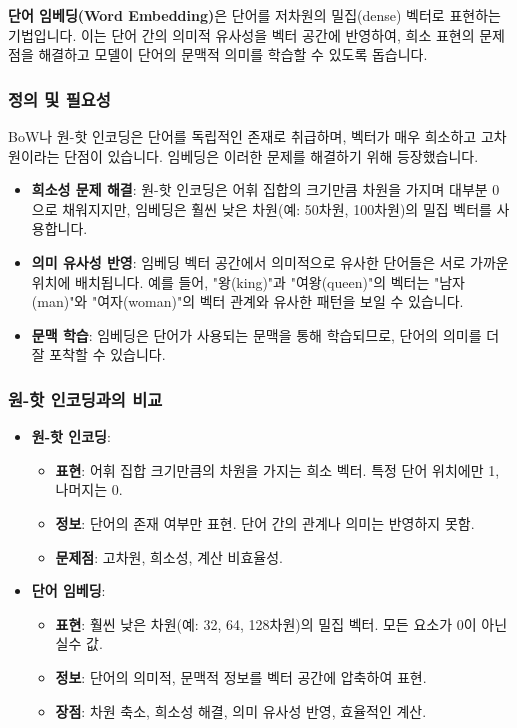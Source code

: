 \documentclass[11pt,a4paper]{article}
\begin{document}
\begin{conceptbox}
\textbf{단어 임베딩(Word Embedding)}은 단어를 저차원의 밀집(dense) 벡터로 표현하는 기법입니다. 이는 단어 간의 의미적 유사성을 벡터 공간에 반영하여, 희소 표현의 문제점을 해결하고 모델이 단어의 문맥적 의미를 학습할 수 있도록 돕습니다.
\end{conceptbox}

\subsubsection{정의 및 필요성}
BoW나 원-핫 인코딩은 단어를 독립적인 존재로 취급하며, 벡터가 매우 희소하고 고차원이라는 단점이 있습니다. 임베딩은 이러한 문제를 해결하기 위해 등장했습니다.

\begin{itemize}
    \item \textbf{희소성 문제 해결}: 원-핫 인코딩은 어휘 집합의 크기만큼 차원을 가지며 대부분 0으로 채워지지만, 임베딩은 훨씬 낮은 차원(예: 50차원, 100차원)의 밀집 벡터를 사용합니다.
    \item \textbf{의미 유사성 반영}: 임베딩 벡터 공간에서 의미적으로 유사한 단어들은 서로 가까운 위치에 배치됩니다. 예를 들어, "왕(king)"과 "여왕(queen)"의 벡터는 "남자(man)"와 "여자(woman)"의 벡터 관계와 유사한 패턴을 보일 수 있습니다.
    \item \textbf{문맥 학습}: 임베딩은 단어가 사용되는 문맥을 통해 학습되므로, 단어의 의미를 더 잘 포착할 수 있습니다.
\end{itemize}

\subsubsection{원-핫 인코딩과의 비교}
\begin{itemize}
    \item \textbf{원-핫 인코딩}:
        \begin{itemize}
            \item \textbf{표현}: 어휘 집합 크기만큼의 차원을 가지는 희소 벡터. 특정 단어 위치에만 1, 나머지는 0.
            \item \textbf{정보}: 단어의 존재 여부만 표현. 단어 간의 관계나 의미는 반영하지 못함.
            \item \textbf{문제점}: 고차원, 희소성, 계산 비효율성.
        \end{itemize}
    \item \textbf{단어 임베딩}:
        \begin{itemize}
            \item \textbf{표현}: 훨씬 낮은 차원(예: 32, 64, 128차원)의 밀집 벡터. 모든 요소가 0이 아닌 실수 값.
            \item \textbf{정보}: 단어의 의미적, 문맥적 정보를 벡터 공간에 압축하여 표현.
            \item \textbf{장점}: 차원 축소, 희소성 해결, 의미 유사성 반영, 효율적인 계산.
        \end{itemize}
\end{itemize}
\end{document}
